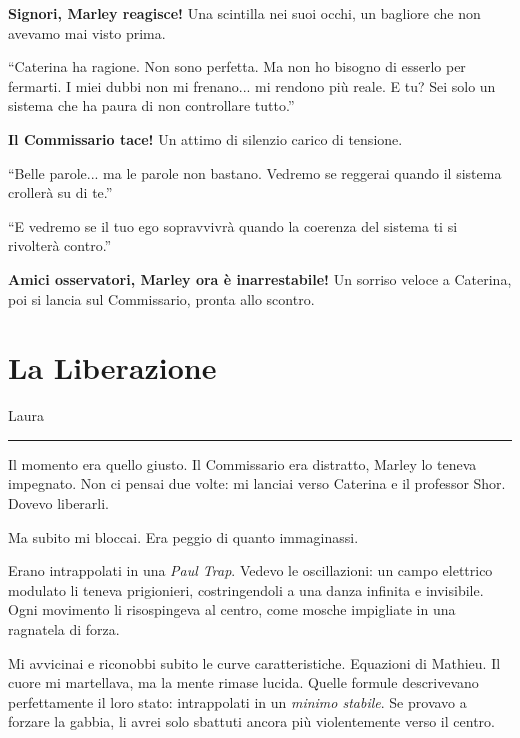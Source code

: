 \textbf{Signori, Marley reagisce!} Una scintilla nei suoi occhi, un bagliore che non avevamo mai visto prima.

\begin{dialogue}  \enquote{Caterina ha ragione. Non sono perfetta. Ma non ho bisogno di esserlo per fermarti. I miei dubbi non mi frenano... mi rendono più reale. E tu? Sei solo un sistema che ha paura di non controllare tutto.} \end{dialogue}

\textbf{Il Commissario tace!} Un attimo di silenzio carico di tensione.

\begin{dialogue}  \enquote{Belle parole... ma le parole non bastano. Vedremo se reggerai quando il sistema crollerà su di te.} \end{dialogue}

\begin{dialogue}  \enquote{E vedremo se il tuo ego sopravvivrà quando la coerenza del sistema ti si rivolterà contro.} \end{dialogue}

\textbf{Amici osservatori, Marley ora è inarrestabile!} Un sorriso veloce a Caterina, poi si lancia sul Commissario, pronta allo scontro.
\section{La Liberazione}

\vspace{1em} \begin{center}Laura\end{center} \hrule \vspace{1em}

Il momento era quello giusto. Il Commissario era distratto, Marley lo teneva impegnato. Non ci pensai due volte: mi lanciai verso Caterina e il professor Shor. Dovevo liberarli.

Ma subito mi bloccai. Era peggio di quanto immaginassi.

Erano intrappolati in una \textit{Paul Trap}. Vedevo le oscillazioni: un campo elettrico modulato li teneva prigionieri, costringendoli a una danza infinita e invisibile. Ogni movimento li risospingeva al centro, come mosche impigliate in una ragnatela di forza.

Mi avvicinai e riconobbi subito le curve caratteristiche. Equazioni di Mathieu. Il cuore mi martellava, ma la mente rimase lucida. Quelle formule descrivevano perfettamente il loro stato: intrappolati in un \textit{minimo stabile}. Se provavo a forzare la gabbia, li avrei solo sbattuti ancora più violentemente verso il centro.

